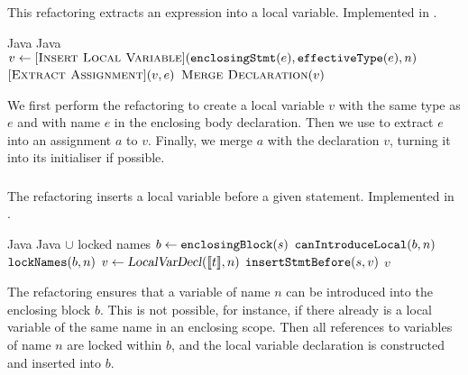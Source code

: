 \subsection{}
This refactoring extracts an expression into a local variable. Implemented in .

\begin{algorithm}
\caption{$\refactoring{Extract Temp}(e : \type{Expr}, n : \type{Name})$}
\begin{algorithmic}[1]
\REQUIRE Java
\ENSURE Java
\medskip
\STATE $v \leftarrow [\textsc{Insert Local Variable}](\text{\texttt{enclosingStmt}}(e), \text{\texttt{effectiveType}}(e), n)$
\STATE $[\textsc{Extract Assignment}](v, e)$
\STATE $\textsc{Merge Declaration}(v)$
\end{algorithmic}
\end{algorithm}

We first perform the  refactoring to create a local variable $v$ with the same type as $e$ and with name $e$ in the enclosing body declaration. Then we use  to extract $e$ into an assignment $a$ to $v$. Finally, we merge $a$ with the declaration $v$, turning it into its initialiser if possible.

\subsubsection{}
The refactoring inserts a local variable before a given statement. Implemented in .

\begin{algorithm}
\caption{$\refactoring{Insert Local Variable}(s : \type{Stmt}, t : \type{Type}, n : \type{Name}) : \type{LocalVarDecl}$}
\begin{algorithmic}[1]
\REQUIRE Java
\ENSURE Java $\cup$ locked names
\medskip
\STATE $b \leftarrow \text{\texttt{enclosingBlock}}(s)$
\STATE \assert $\text{\texttt{canIntroduceLocal}}(b, n)$
\STATE $\text{\texttt{lockNames}}(b, n)$
\STATE $v \leftarrow \text{\textsl{LocalVarDecl}}(\llbracket t\rrbracket, n)$
\STATE $\text{\texttt{insertStmtBefore}}(s, v)$
\RETURN $v$
\end{algorithmic}
\end{algorithm}

The refactoring ensures that a variable of name $n$ can be introduced into the enclosing block $b$. This is not possible, for instance, if there already is a local variable of the same name in an enclosing scope. Then all references to variables of name $n$ are locked within $b$, and the local variable declaration is constructed and inserted into $b$.

